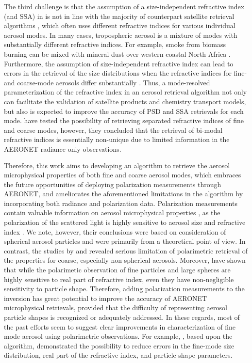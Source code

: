 The third challenge is that the assumption of a size-independent refractive
index (and SSA) in \Dub is not in line with the majority of counterpart
satellite retrieval algorithms \citep[e.g.,][]{Mishchenko07, Hasekamp11,
Martonchik09}, which often uses different refractive indices
for various individual aerosol modes. In many cases, tropospheric aerosol is a
mixture of modes with substantially different refractive indices. For example,
smoke from biomass burning can be mixed with mineral dust over western coastal
North Africa \citep{Yang13}. Furthermore, the assumption of
size-independent refractive index can lead to errors in the retrieval of the
size distributions when the refractive indices for fine- and coarse-mode
aerosols differ substantially \citep{Dubovik00b, Chowdhary01}.
Thus, a mode-resolved parameterization of the refractive index in an aerosol
retrieval algorithm not only can facilitate the validation of satellite
products and chemistry transport models, but also is expected to improve the
accuracy of PSD and SSA retrievals for each mode. \citep{Dubovik00b} have
tested the possibility of retrieving separated refractive indices of fine and
coarse modes, however, they concluded that the retrieval of bi-modal refractive
indices is essentially non-unique due to limited information in the AERONET
radiance-only observations. 

Therefore, this work aims to developing an algorithm to retrieve the aerosol
microphysical properties of both fine and coarse aerosol modes,
which embraces the future opportunities of
deploying polarization measurements through AERONET, and ameliorates the
aforementioned limitations in the \Dub algorithm by incorporating both
radiance and polarization data. Polarization measurements contain valuable
information on aerosol microphysical properties \citep{Mishchenko97},
as the polarization of the scattered light is highly sensitive to aerosol size
and refractive index \citep{Hansen74, Mishchenko02}. We note, however, their
conclusions were based on consideration of
spherical aerosol particles and were primarily from a theoretical point of
view. In contrast, the studies by \citet{Dubovik06} and \citet{Deuze93,
Deuze01} revealed serious limitation of polarimetric retrieval of the properties
for coarse, especially non-spherical aerosols. Moreover, \citet{Dubovik06}
have shown that while the polarimetic observation of fine particles and large
spheres are highly sensitive to real part of refractive index, even they have
non-negligible sensitivity to particle shape. Therefore, adding polarization
measurements to the inversion has great potential to improve the accuracy of
AERONET microphysical retrievals, provided that the difficulty of representing
aerosol particle shapes is recognized or adequately addressed. In these
regards, most of the past efforts seem to suggest clear improvements in
characterization of fine mode aerosol using polarimetric observations. For
example, \citet{Li09}, based upon the \Dub algorithm, demonstrated
the possibility to reduce errors in the fine-mode size distribution, real part
of the refractive index, and particle shape parameters. 

